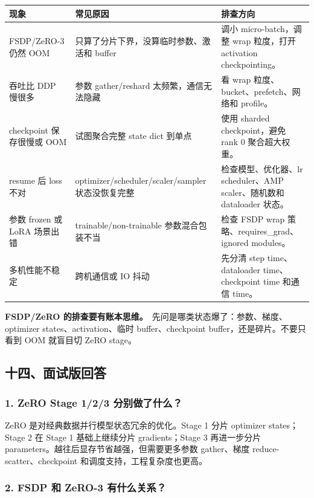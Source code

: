 \begin{center}
{\small
\begin{tabular}{p{3.8cm}p{4.8cm}p{4.2cm}}
\hline
\textbf{现象} & \textbf{常见原因} & \textbf{排查方向} \\
\hline
FSDP/ZeRO-3 仍然 OOM & 只算了分片下界，没算临时参数、激活和 buffer & 调小 micro-batch，调整 wrap 粒度，打开 activation checkpointing。 \\
吞吐比 DDP 慢很多 & 参数 gather/reshard 太频繁，通信无法隐藏 & 看 wrap 粒度、bucket、prefetch、网络和 profile。 \\
checkpoint 保存很慢或 OOM & 试图聚合完整 state dict 到单点 & 使用 sharded checkpoint，避免 rank 0 聚合超大权重。 \\
resume 后 loss 不对 & optimizer/scheduler/scaler/sampler 状态没恢复完整 & 检查模型、优化器、lr scheduler、AMP scaler、随机数和 dataloader 状态。 \\
参数 frozen 或 LoRA 场景出错 & trainable/non-trainable 参数混合包装不当 & 检查 FSDP wrap 策略、requires\_grad、ignored modules。 \\
多机性能不稳定 & 跨机通信或 IO 抖动 & 先分清 step time、dataloader time、checkpoint time 和通信 time。 \\
\hline
\end{tabular}
}
\end{center}

\begin{warnbox}
\textbf{FSDP/ZeRO 的排查要有账本思维。}\
先问是哪类状态爆了：参数、梯度、optimizer states、activation、临时 buffer、checkpoint buffer，还是碎片。不要只看到 OOM 就盲目切 ZeRO stage。
\end{warnbox}

\subsection{十四、面试版回答}

\subsubsection*{1. ZeRO Stage 1/2/3 分别做了什么？}

ZeRO 是对经典数据并行模型状态冗余的优化。Stage 1 分片 optimizer states；Stage 2 在 Stage 1 基础上继续分片 gradients；Stage 3 再进一步分片 parameters。越往后显存节省越强，但需要更多参数 gather、梯度 reduce-scatter、checkpoint 和调度支持，工程复杂度也更高。

\subsubsection*{2. FSDP 和 ZeRO-3 有什么关系？}

